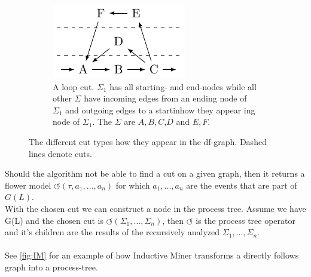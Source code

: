 \documentclass[
	a4paper,
	pagesize,
	pdftex,
	12pt,
	twoside, %
	BCOR=5mm, %
	ngerman,
	fleqn,
	final,
	]{scrartcl}
\begin{document}
\begin{figure}[h]
\begin{subfigure}[t]{.5\textwidth}
			\centering
				  \includegraphics[width=0.8\linewidth]{img/loop_cut.pdf}
				  \caption{A loop cut. $\Sigma_1$ has all starting- and end-nodes while all other $\Sigma$ have incoming edges from an ending node of $\Sigma_1$ and outgoing edges to a startinhow they appear ing node of $\Sigma_1$. The $\Sigma$ are ${A,B,C}$,${D}$ and ${E,F}$.}
				  \label{fig:loop_cut}
		\end{subfigure}
\caption{The different cut types how they appear in the df-graph. Dashed lines denote cuts.}
\label{fig:netClasses}
\end{figure}
Should the algorithm not be able to find a cut on a given graph, then it returns a flower model $\circlearrowleft(\tau, a_1,...,a_n)$ for which $a_1,...,a_n$ are the events that are part of $G(L)$.\\
With the chosen cut we can construct a node in the process tree. Assume we have G(L) and the chosen cut is $\circlearrowleft(\Sigma_1,...,\Sigma_n)$, then $\circlearrowleft$ is the process tree operator and it's children are the results of the recursively analyzed $\Sigma_1,...,\Sigma_n$.\\\\ See \ref{fig:IM} for an example of how Inductive Miner transforms a directly follows graph into a process-tree.
\end{document}
